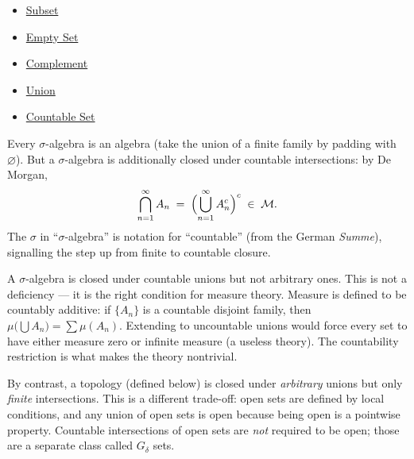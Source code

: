 \begin{dependencies}
\begin{itemize}
  \item \hyperref[def:subset]{Subset}
  \item \hyperref[def:empty-set]{Empty Set}
  \item \hyperref[def:complement]{Complement}
  \item \hyperref[def:union]{Union}
  \item \hyperref[def:countable]{Countable Set}
\end{itemize}
\end{dependencies}

\begin{remark*}
Every $\sigma$-algebra is an algebra (take the union of a finite family by
padding with $\varnothing$). But a $\sigma$-algebra is additionally closed
under countable intersections: by De Morgan,
\[
\bigcap_{n=1}^{\infty} A_n
\;=\;
\Bigl(\bigcup_{n=1}^{\infty} A_n^c\Bigr)^c
\;\in\; \mathcal{M}.
\]
The $\sigma$ in ``$\sigma$-algebra'' is notation for ``countable'' (from the
German \emph{Summe}), signalling the step up from finite to countable closure.
\end{remark*}

\begin{remark*}
A $\sigma$-algebra is closed under countable unions but not arbitrary ones.
This is not a deficiency --- it is the right condition for measure theory.
Measure is defined to be countably additive: if $\{A_n\}$ is a countable
disjoint family, then $\mu\bigl(\bigcup A_n\bigr) = \sum \mu(A_n)$. Extending
to uncountable unions would force every set to have either measure zero or
infinite measure (a useless theory). The countability restriction is what makes
the theory nontrivial.

By contrast, a topology (defined below) is closed under \emph{arbitrary}
unions but only \emph{finite} intersections. This is a different trade-off:
open sets are defined by local conditions, and any union of open sets is open
because being open is a pointwise property. Countable intersections of open
sets are \emph{not} required to be open; those are a separate class called
$G_\delta$ sets.
\end{remark*}


